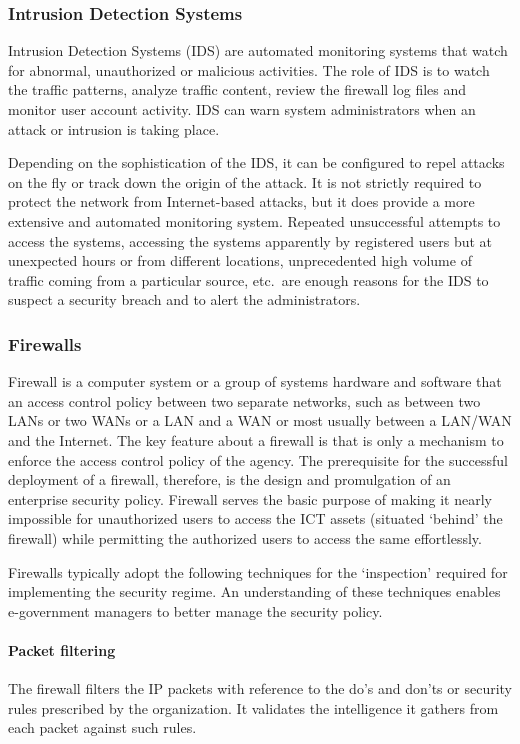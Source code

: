 \subsubsection{Intrusion Detection Systems}
Intrusion Detection Systems (IDS) are automated monitoring systems that watch for
abnormal, unauthorized or malicious activities. The role of IDS is to watch the traffic
patterns, analyze traffic content, review the firewall log files and monitor user account
activity. IDS can warn system administrators when an attack or intrusion is taking place.

Depending on the sophistication of the IDS, it can be configured to repel attacks on the fly
or track down the origin of the attack. It is not strictly required to protect the network from
Internet-based attacks, but it does provide a more extensive and automated monitoring
system. Repeated unsuccessful attempts to access the systems, accessing the systems
apparently by registered users but at unexpected hours or from different locations,
unprecedented high volume of traffic coming from a particular source, etc.\ are enough
reasons for the IDS to suspect a security breach and to alert the administrators.

\subsubsection{Firewalls}
Firewall is a computer system or a group of systems hardware and software that an access control policy between two separate networks, such as between two LANs or two WANs or a LAN and a WAN or most usually between a LAN/WAN and the Internet. The key feature about a firewall is that is only a mechanism to enforce the access control policy of the agency. The prerequisite for the successful deployment of a firewall, therefore, is the design and promulgation of an enterprise security policy. Firewall serves the basic purpose of making it nearly impossible for unauthorized users to access the ICT assets (situated `behind' the firewall) while permitting the authorized users to access the same effortlessly.

Firewalls typically adopt the following techniques for the ‘inspection’ required for
implementing the security regime. An understanding of these techniques enables
e-government managers to better manage the security policy.

\paragraph*{Packet filtering}
The firewall filters the IP packets with reference to the do’s and
don’ts or security rules prescribed by the organization. It validates the intelligence
it gathers from each packet against such rules.

